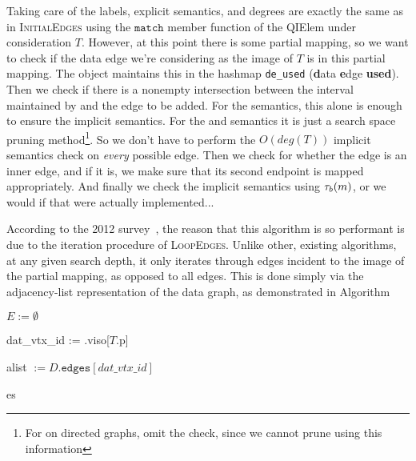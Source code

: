 Taking care of the labels, explicit semantics, and degrees are exactly the same
as in \textsc{InitialEdges} using the $\texttt{match}$ member function of the
QIElem under consideration $T$. However, at this point there is some partial
mapping, so we want to check if the data edge we're considering as the image of
$T$ is in this partial mapping. The \iso object maintains this in the hashmap
\texttt{de\_used} (\textbf{d}ata \textbf{e}dge \textbf{used}). Then we check if
there is a nonempty intersection between the interval maintained by \iso and the
edge to be added. For the \concur semantics, this alone is enough to ensure the
implicit semantics. For the \strongConsec and \weakConsec semantics it is just a
search space pruning method\footnote{For \weakConsec on directed graphs, omit
  the check, since we cannot prune using this information}. So we don't have to
perform the $O(deg(T))$ implicit semantics check on \textit{every} possible
edge. Then we check \iso for whether the edge is an inner edge, and if it is, we
make sure that its second endpoint is mapped appropriately.  And finally we
check the implicit semantics using $\tau_b(m)$, or we would if that were
actually implemented... 

According to the 2012 survey~\cite{2012-VLDB-IsoSurvey}, the reason that this
algorithm is so performant is due to the iteration procedure of
\textsc{LoopEdges}. Unlike other, existing algorithms, at any given search
depth, it only iterates through edges incident to the image of the partial
mapping, as opposed to all edges.  This is done simply via the adjacency-list
representation of the data graph, as demonstrated in
Algorithm~\cite{alg:loop_edges}

\begin{algorithm}
  \label{alg:loop_edges}
  \caption{$\textsc{LoopEdges}(\seq, D, T, \iso)$}

  $E := \emptyset$\;
  
  dat\_vtx\_id := \iso.viso[$T$.p]\;
  
  alist $:= D.\texttt{edges}[dat\_vtx\_id]$\;

  \Return es \;
\end{algorithm}
